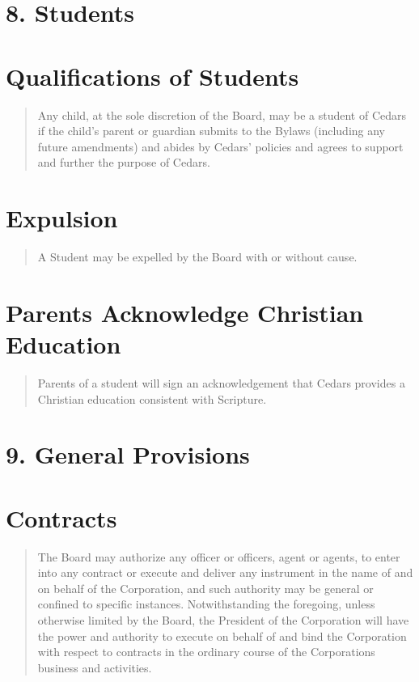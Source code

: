 \documentclass[
]{book}
\begin{document}
\section{8. Students}\label{students}

\section{Qualifications of Students}\label{qualifications-of-students}

\begin{quote}
Any child, at the sole discretion of the Board, may be a student of
Cedars if the child's parent or guardian submits to the Bylaws
(including any future amendments) and abides by Cedars' policies and
agrees to support and further the purpose of Cedars.
\end{quote}

\section{Expulsion}\label{expulsion}

\begin{quote}
A Student may be expelled by the Board with or without cause.
\end{quote}

\section{Parents Acknowledge Christian Education}\label{parents-acknowledge-christian-education}

\begin{quote}
Parents of a student will sign an acknowledgement that Cedars provides
a Christian education consistent with Scripture.
\end{quote}

\section{9. General Provisions}\label{general-provisions}

\section{Contracts}\label{contracts}

\begin{quote}
The Board may authorize any officer or officers, agent or agents, to
enter into any contract or execute and deliver any instrument in the
name of and on behalf of the Corporation, and such authority may be
general or confined to specific instances. Notwithstanding the
foregoing, unless otherwise limited by the Board, the President of the
Corporation will have the power and authority to execute on behalf of
and bind the Corporation with respect to contracts in the ordinary
course of the Corporation\textquotesingle s business and activities.
\end{quote}
\end{document}
